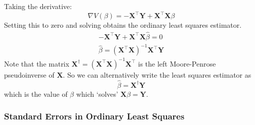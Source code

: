 \documentclass[11pt]{report} %
\begin{document}
Taking the derivative:
\begin{equation}
\nabla V\left(\beta\right) = -\mathbf{X}^{\top}\mathbf{Y} + \mathbf{X}^{\top}\mathbf{X}\beta
\end{equation}
Setting this to zero and solving obtains the ordinary least squares estimator.
\begin{gather}
-\mathbf{X}^{\top}\mathbf{Y} + \mathbf{X}^{\top}\mathbf{X}\hat{\beta} = 0 \\
\hat{\beta} = \left(\mathbf{X}^{\top}\mathbf{X}\right)^{-1}\mathbf{X}^{\top}\mathbf{Y}
\end{gather}
Note that the matrix $\mathbf{X}^{\dagger} = \left(\mathbf{X}^{\top}\mathbf{X}\right)^{-1}\mathbf{X}^{\top}$ is the left Moore-Penrose pseudoinverse of $\mathbf{X}$. So we can alternatively write the least squares estimator as
\begin{equation}
\hat{\beta} = \mathbf{X}^{\dagger}\mathbf{Y}
\end{equation}
which is the value of $\beta$ which `solves' $\mathbf{X}\beta = \mathbf{Y}$.

\subsubsection{Standard Errors in Ordinary Least Squares}
\end{document}
